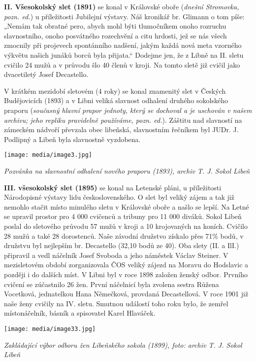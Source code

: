 \textbf{II. Všesokolský slet (1891)} se konal v Královské oboře
(\emph{dnešní Stromovka, pozn. ed.}) u příležitosti Jubilejní výstavy.
Náš kronikář br. Glimann o tom píše: „Nemám tak obratné pero, abych mohl
býti tlumočníkem onoho rozruchu slavnostního, onoho posvátného
rozechvění a citu hrdosti, jež se nás všech zmocnily při projevech
spontánního nadšení, jakým každá nová meta vzorného výkvětu našich
junáků borců byla přijata.`` Dodejme jen, že z Libně na II. sletu
cvičilo 24 mužů a v průvodu šlo 40 členů v kroji. Na tomto sletě již
cvičil jako dvacetiletý Josef Decastello.

V krátkém mezidobí sletovém (4 roky) se konal znamenitý slet v Českých
Budějovicích (1893) a v Libni veliká slavnost odhalení druhého
sokolského praporu (\emph{současný hlavní prapor jednoty, který se
dochoval a je uschován v našem archivu; jeho repliku pravidelně
používáme, pozn. ed.}). Záštitu nad slavností na zámeckém nádvoří
převzala obec libeňská, slavnostním řečníkem byl JUDr. J. Podlipný a
Libeň byla slavnostně vyzdobena.

\texttt{[image: media/image3.jpg]}

\emph{Pozvánka na slavnostní odhalení nového praporu (1893), archiv T.
J. Sokol Libeň}

\textbf{III. všesokolský slet (1895)} se konal na Letenské pláni, u
příležitosti Národopisné výstavy lidu československého. O slet byl
veliký zájem a tak již nemohlo stačit místo minulého sletu v Královské
oboře a našlo se lepší. Na Letné se upravil prostor pro 4 000 cvičenců a
tribuny pro 11 000 diváků. Sokol Libeň poslal do sletového průvodu 57
mužů v kroji a 10 krojovaných na koních. Cvičilo 28 mužů a také 28
dorostenců. Naše závodní družstvo získalo přes 71\% bodů, v družstvu byl
nejlepším br. Decastello (32,10 bodů ze 40). Oba slety (II. a IlI.)
připravil a vedl náčelník Josef Svoboda a jeho náměstek Václav Steiner.
V mezisletovém období zorganizovala ČOS veliký zájezd na Moravu do
Hodslavic a později i do dalších míst. V Libni byl v roce 1898 založen
ženský odbor. Prvního cvičení se zúčastnilo 26 žen. První náčelnicí byla
zvolena sestra Růžena Vocetková, jednatelkou Hana Němečková, provdaná
Decastellová. V roce 1901 již naše ženy cvičily na IV. sletu. Smutnou
událostí toho roku bylo, že zemřel místonáčelník, básník a spisovatel
Karel Hlaváček.

\texttt{[image: media/image33.jpg]}

\emph{Zakládající výbor odboru žen Libeňského sokola (1899), foto:
archiv T. J. Sokol Libeň}

